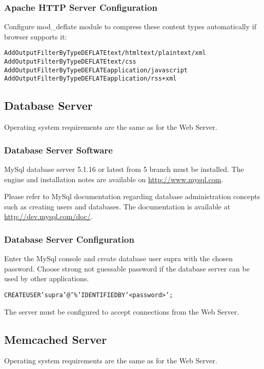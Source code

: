 \documentclass[12pt]{article}
\begin{document}
\subsubsection{Apache HTTP Server Configuration}

Configure \textsf{mod\_deflate} module to compress these content types automatically if browser supports it:

\begin{alltt}
AddOutputFilterByType DEFLATE text/html text/plain text/xml
AddOutputFilterByType DEFLATE text/css
AddOutputFilterByType DEFLATE application/javascript
AddOutputFilterByType DEFLATE application/rss+xml
\end{alltt}

\subsection{Database Server}
Operating system requirements are the same as for the Web Server.

\subsubsection{Database Server Software}

MySql database server 5.1.16 or latest from 5 branch must be installed. The engine and installation notes are available on \url{http://www.mysql.com}.

Please refer to MySql documentation regarding database administration concepts such as creating users and databases. The documentation is available at \url{http://dev.mysql.com/doc/}.

\subsubsection{Database Server Configuration}

Enter the MySql console and create database user \textsf{supra} with the chosen password. Choose strong not guessable password if the database server can be used by other applications.

\begin{alltt}
CREATE USER 'supra'@'\%' IDENTIFIED BY '<password>';
\end{alltt}

The server must be configured to accept connections from the Web Server.

\subsection{Memcached Server}
Operating system requirements are the same as for the Web Server.
\end{document}
